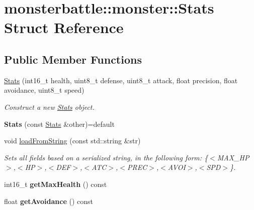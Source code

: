 \hypertarget{structmonsterbattle_1_1monster_1_1Stats}{}\section{monsterbattle\+:\+:monster\+:\+:Stats Struct Reference}
\label{structmonsterbattle_1_1monster_1_1Stats}
\subsection*{Public Member Functions}
\begin{DoxyCompactItemize}
\item 
\hyperlink{structmonsterbattle_1_1monster_1_1Stats_a997e44d5e65e8938448dbeec9a2647e4}{Stats} (int16\+\_\+t health, uint8\+\_\+t defense, uint8\+\_\+t attack, float precision, float avoidance, uint8\+\_\+t speed)
\begin{DoxyCompactList}\small\item\em Construct a new \hyperlink{structmonsterbattle_1_1monster_1_1Stats}{Stats} object. \end{DoxyCompactList}\item 
\mbox{\label{structmonsterbattle_1_1monster_1_1Stats_a6c161b357a4fbbe12036431c14715930}} 
{\bfseries Stats} (const \hyperlink{structmonsterbattle_1_1monster_1_1Stats}{Stats} \&other)=default
\item 
void \hyperlink{structmonsterbattle_1_1monster_1_1Stats_ae68b4ba1cb21c4aa376ed3d22ca16603}{load\+From\+String} (const std\+::string \&str)
\begin{DoxyCompactList}\small\item\em Sets all fields based on a serialized string, in the following form\+: \{$<$\+M\+A\+X\+\_\+\+H\+P$>$,$<$\+H\+P$>$,$<$\+D\+E\+F$>$,$<$\+A\+T\+C$>$,$<$\+P\+R\+E\+C$>$,$<$\+A\+V\+O\+I$>$,$<$\+S\+P\+D$>$\}. \end{DoxyCompactList}\item 
\mbox{\label{structmonsterbattle_1_1monster_1_1Stats_a291794552a99e36703c1c23aae95cff3}} 
int16\+\_\+t {\bfseries get\+Max\+Health} () const
\item 
\mbox{\label{structmonsterbattle_1_1monster_1_1Stats_a0982da575bf8f1796bd71c41892ea759}} 
float {\bfseries get\+Avoidance} () const

\end{DoxyCompactItemize}
